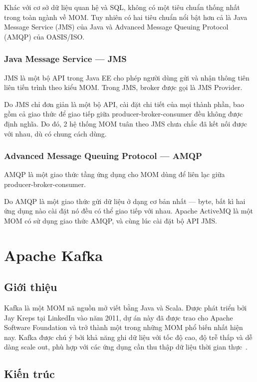 \documentclass{article}
\begin{document}
Khác với cơ sở dữ liệu quan hệ và SQL, không có một tiêu chuẩn thống nhất trong
toàn ngành về MOM\@. Tuy nhiên có hai tiêu chuẩn nổi bật hơn cả là Java Message
Service (JMS) của Java và Advanced Message Queuing Protocol (AMQP) của
OASIS/ISO\@.

\subsubsection{Java Message Service --- JMS}

JMS là một bộ API trong Java EE cho phép người dùng gửi và nhận thông tiên liên
tiến trình theo kiểu MOM\@. Trong JMS, broker được gọi là JMS Provider.

Do JMS chỉ đơn giản là một bộ API, cài đặt chi tiết của mọi thành phần, bao gồm
cả giao thức để giao tiếp giữa producer-broker-consumer đều không được định
nghĩa. Do đó, 2 hệ thống MOM tuân theo JMS chưa chắc đã kết nối được với nhau,
dù có chung cách dùng.

\subsubsection{Advanced Message Queuing Protocol --- AMQP}

AMQP là một giao thức tầng ứng dụng cho MOM dùng để liên lạc giữa
producer-broker-consumer.

Do AMQP là một giao thức gửi dữ liệu ở dạng cơ bản nhất --- byte, bất kì hai ứng
dụng nào cài đặt nó đều có thể giao tiếp với nhau. Apache ActiveMQ là một MOM có
sử dụng giao thức AMQP, và cùng lúc cài đặt bộ API JMS\@.

\section{Apache Kafka}\label{kafka}

\subsection{Giới thiệu}

Kafka là một MOM nã nguồn mở viết bằng Java và Scala. Được phát triển bởi Jay
Kreps tại LinkedIn vào năm 2011, dự án này đã được trao cho Apache Software
Foundation và trở thành một trong những MOM phổ biến nhất hiện nay. Kafka được
chú ý bởi khả năng ghi dữ liệu với tốc độ cao, độ trễ thấp và dễ dàng scale out,
phù hợp với các ứng dụng cần thu thập dữ liệu thời gian thực~\cite{kafka_intro}.

\subsection{Kiến trúc}
\end{document}
